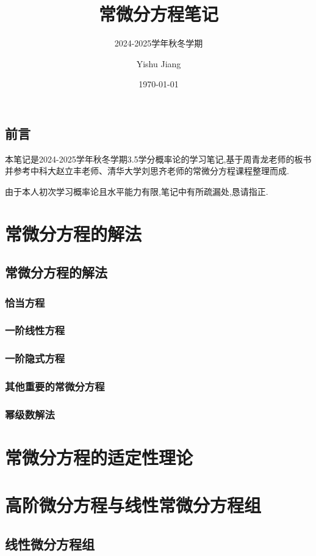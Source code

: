 \documentclass[lang=cn,10pt]{elegantbook}
\title{常微分方程笔记}
\subtitle{2024-2025学年秋冬学期}
\author{Yishu Jiang}
\institute{School of Economics,Zhejiang University}
\date{\today}
\begin{document}
\maketitle
\frontmatter
\chapter*{前言}
{\fangsong 
    本笔记是2024-2025学年秋冬学期3.5学分概率论的学习笔记,基于周青龙老师的板书并参考中科大赵立丰老师、清华大学刘思齐老师的常微分方程课程整理而成.

    由于本人初次学习概率论且水平能力有限,笔记中有所疏漏处,恳请指正.
}
\newpage

\tableofcontents

\mainmatter
\part{常微分方程的解法}
\chapter{常微分方程的解法}
\section{恰当方程}
\section{一阶线性方程}
\section{一阶隐式方程}
\section{其他重要的常微分方程}
\section{幂级数解法}
\newpage

\part{常微分方程的适定性理论}



\part{高阶微分方程与线性常微分方程组}
\chapter{线性微分方程组}
\end{document}
